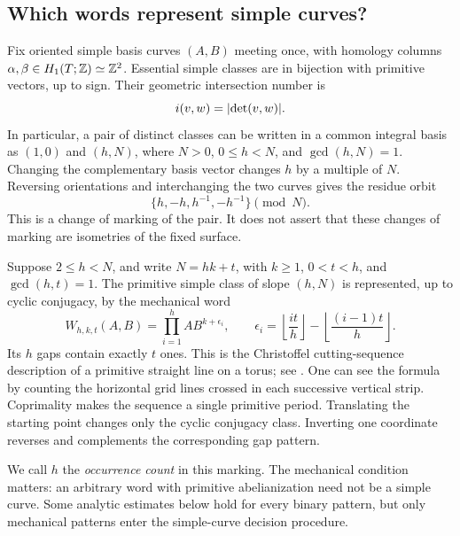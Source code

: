 \subsection{Which words represent simple curves?}

Fix oriented simple basis curves $(A,B)$ meeting once, with homology
columns $\alpha,\beta\in H_1(T;\mathbb{Z})\simeq\mathbb{Z}^2$. Essential simple classes
are in bijection with primitive vectors, up to sign. Their geometric
intersection number is
\begin{equation}\label{eq:intersection-determinant}
 i(v,w)=\lvert\det(v,w)\rvert.
\end{equation}
In particular, a pair of distinct classes can be written in a common
integral basis as $(1,0)$ and $(h,N)$, where $N>0$, $0\leqslant h<N$,
and $\gcd(h,N)=1$. Changing the complementary basis vector changes $h$
by a multiple of $N$. Reversing orientations and interchanging the two
curves gives the residue orbit
\begin{equation}\label{eq:residue-orbit}
 \{h,-h,h^{-1},-h^{-1}\}\pmod N.
\end{equation}
This is a change of marking of the pair. It does not assert that these
changes of marking are isometries of the fixed surface.

Suppose $2\leqslant h<N$, and write $N=hk+t$, with $k\geqslant1$,
$0<t<h$, and $\gcd(h,t)=1$. The primitive simple class of slope
$(h,N)$ is represented, up to cyclic conjugacy, by the mechanical word
\begin{equation}\label{eq:mechanical-word}
 W_{h,k,t}(A,B)=\prod_{i=1}^h AB^{k+\epsilon_i},\qquad
 \epsilon_i=\left\lfloor\frac{it}{h}\right\rfloor
             -\left\lfloor\frac{(i-1)t}{h}\right\rfloor.
\end{equation}
Its $h$ gaps contain exactly $t$ ones. This is the Christoffel
cutting-sequence description of a primitive straight line on a torus;
see \cite{Reutenauer2009}. One can see the formula by counting the
horizontal grid lines crossed in each successive vertical strip.
Coprimality makes the sequence a single primitive period. Translating
the starting point changes only the cyclic conjugacy class. Inverting
one coordinate reverses and complements the corresponding gap pattern.

We call $h$ the \emph{occurrence count} in this marking. The mechanical
condition matters: an arbitrary word with primitive abelianization need
not be a simple curve. Some analytic estimates below hold for every
binary pattern, but only mechanical patterns enter the simple-curve
decision procedure.

